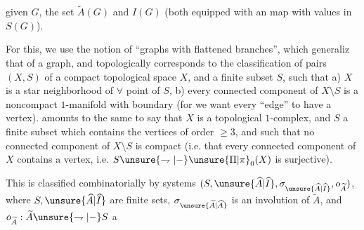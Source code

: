 given $G$, the set $\widetilde A(G)$ and $I(G)$ (both equipped with an  map with values in $S(G)$).

For this, we  use the notion of ``graphs with flattened branches'', which generaliz that of a graph, and topologically corresponds to the classification of  pairs $(X,S)$ of a compact topological space $X$, and a finite subset $S$, such that a) $X$ is a star  neighborhood of $\forall$ point of $S$,  b)  every connected component of $X\setminus S$ is a noncompact $1$-manifold with boundary (for we want every  ``edge'' to have a vertex).  amounts to the same to say that $X$ is a topological $1$-complex, and $S$ a finite subset which contains the vertices of order $\geq3$, and such that no connected component of $X\setminus S$ is compact (i.e. that every connected component of $X$ contains a vertex, i.e. $S\unsure{\rightharpoondown|{-}}\unsure{\Pi|\pi}_0(X)$ is surjective).

This is classified combinatorially by systems $(S,\unsure{\widehat A|\widehat I},\sigma_{\unsure{\widehat A|\widehat I}},o_{\widetilde A})$, where  $S,\unsure{\widehat A|\widehat I}$ are finite sets, $\sigma_{\unsure{\widetilde A|\widehat A}}$ is an involution of $\widetilde A$, and $o_{\widetilde A}:\widetilde A\unsure{\rightharpoondown|{-}}S$ a
